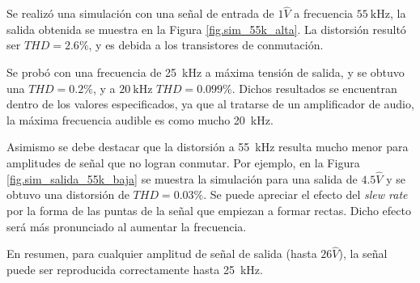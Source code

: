 Se realizó una simulación con una señal de entrada de $1 \hat{V}$ a frecuencia $\SI{55}{\kilo\hertz}$, la salida obtenida se muestra en la Figura \ref{fig.sim_55k_alta}. La distorsión resultó ser $THD = \num{2.6}\%$, y es debida a los transistores de conmutación. 


	Se probó con una frecuencia de \SI{25}{\kilo\hertz} a máxima tensión de salida, y se obtuvo una $THD=\num{0.2}\%$, y a $\SI{20}{\kilo\hertz}$ $THD=\num{0.099}\%$. Dichos resultados se encuentran dentro de los valores especificados, ya que al tratarse de un amplificador de audio, la máxima frecuencia audible es como mucho \SI{20}{\kilo\hertz}.



Asimismo se debe destacar que la distorsión a \SI{55}{\kilo\hertz} resulta mucho menor para amplitudes de señal que no logran conmutar. Por ejemplo, en la Figura \ref{fig.sim_salida_55k_baja} se muestra la simulación para una salida de $\num{4.5}\hat{V}$ y se obtuvo una distorsión de $THD=\num{0.03}\%$. Se puede apreciar el efecto del \textit{slew rate} por la forma de las puntas de la señal que empiezan a formar rectas. Dicho efecto será más pronunciado al aumentar la frecuencia.



En resumen, para cualquier amplitud de señal de salida (hasta $26\hat{V}$), la señal puede ser reproducida correctamente hasta \SI{25}{\kilo\hertz}.

